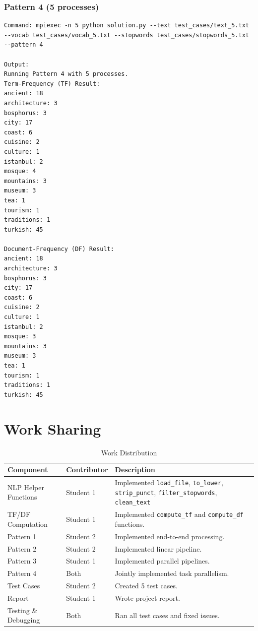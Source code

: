 \documentclass[12pt,a4paper]{article}
\begin{document}
\subsubsection{Pattern 4 (5 processes)}
\begin{lstlisting}
Command: mpiexec -n 5 python solution.py --text test_cases/text_5.txt --vocab test_cases/vocab_5.txt --stopwords test_cases/stopwords_5.txt --pattern 4

Output:
Running Pattern 4 with 5 processes.
Term-Frequency (TF) Result:
ancient: 18
architecture: 3
bosphorus: 3
city: 17
coast: 6
cuisine: 2
culture: 1
istanbul: 2
mosque: 4
mountains: 3
museum: 3
tea: 1
tourism: 1
traditions: 1
turkish: 45

Document-Frequency (DF) Result:
ancient: 18
architecture: 3
bosphorus: 3
city: 17
coast: 6
cuisine: 2
culture: 1
istanbul: 2
mosque: 3
mountains: 3
museum: 3
tea: 1
tourism: 1
traditions: 1
turkish: 45
\end{lstlisting}

\section{Work Sharing}


\begin{table}[h]
\centering
\begin{tabular}{|l|l|p{8cm}|}
\hline
\textbf{Component} & \textbf{Contributor} & \textbf{Description} \\
\hline
NLP Helper Functions & Student 1 & Implemented \texttt{load\_file}, \texttt{to\_lower}, \texttt{strip\_punct}, \texttt{filter\_stopwords}, \texttt{clean\_text} \\
\hline
TF/DF Computation & Student 1 & Implemented \texttt{compute\_tf} and \texttt{compute\_df} functions. \\
\hline
Pattern 1 & Student 2 & Implemented end-to-end processing. \\
\hline
Pattern 2 & Student 2 & Implemented linear pipeline. \\
\hline
Pattern 3 & Student 1 & Implemented parallel pipelines. \\
\hline
Pattern 4 & Both & Jointly implemented task parallelism. \\
\hline
Test Cases & Student 2 & Created 5 test cases. \\
\hline
Report & Student 1 & Wrote project report. \\
\hline
Testing \& Debugging & Both & Ran all test cases and fixed issues. \\
\hline
\end{tabular}
\caption{Work Distribution}
\end{table}
\end{document}
